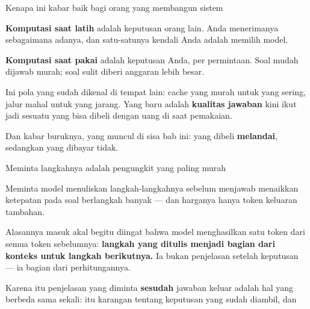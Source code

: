 \documentclass[aspectratio=169,11pt,t]{beamer}
\begin{document}
\begin{frame}[shrink=25]{Kenapa ini kabar baik bagi orang yang membangun sistem}
\begin{minipage}[t]{0.485\textwidth}
{\fontsize{9.4}{12.6}\selectfont\color{fg2}\textbf{Komputasi saat latih} adalah keputusan orang lain. Anda menerimanya sebagaimana adanya, dan satu-satunya kendali Anda adalah memilih model.\par}\vskip 4pt

\end{minipage}%
\hfill
\begin{minipage}[t]{0.485\textwidth}
{\fontsize{9.4}{12.6}\selectfont\color{fg2}\textbf{Komputasi saat pakai} adalah keputusan Anda, per permintaan. Soal mudah dijawab murah; soal sulit diberi anggaran lebih besar.\par}\vskip 4pt

\end{minipage}%
{\fontsize{9.4}{12.6}\selectfont\color{fg2}Ini pola yang sudah dikenal di tempat lain: cache yang murah untuk yang sering, jalur mahal untuk yang jarang. Yang baru adalah \textbf{kualitas jawaban} kini ikut jadi sesuatu yang bisa dibeli dengan uang di saat pemakaian.\par}\vskip 4pt
\begin{iband}[signal]
Dan kabar buruknya, yang muncul di sisa bab ini: yang dibeli \textbf{melandai}, sedangkan yang dibayar tidak.
\end{iband}
\end{frame}


\begin{frame}[shrink=25]{Meminta langkahnya adalah pengungkit yang paling murah}
{\fontsize{9.4}{12.6}\selectfont\color{fg2}Meminta model menuliskan langkah-langkahnya sebelum menjawab menaikkan ketepatan pada soal berlangkah banyak --- dan harganya hanya token keluaran tambahan.\par}\vskip 4pt
{\fontsize{9.4}{12.6}\selectfont\color{fg2}Alasannya masuk akal begitu diingat bahwa model menghasilkan satu token dari semua token sebelumnya: \textbf{langkah yang ditulis menjadi bagian dari konteks untuk langkah berikutnya.} Ia bukan penjelasan setelah keputusan --- ia bagian dari perhitungannya.\par}\vskip 4pt
\begin{iband}[signal]
Karena itu penjelasan yang diminta \textbf{sesudah} jawaban keluar adalah hal yang berbeda sama sekali: itu karangan tentang keputusan yang sudah diambil, dan 
\end{iband}
\end{frame}
\end{document}
